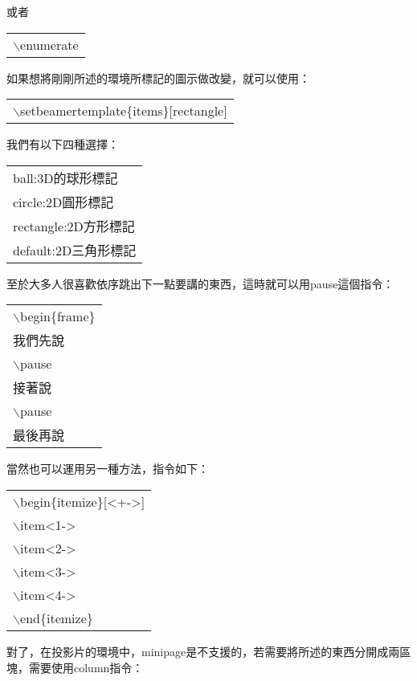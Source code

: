 \documentclass[12pt, a4paper]{article}
\begin{document}
或者
\begin{center}\colorbox{slight}{\begin{tabular}{p{}}
	{$\backslash$enumerate}
\end{tabular}}
\end{center}
如果想將剛剛所述的環境所標記的圖示做改變，就可以使用：
\begin{center}\colorbox{slight}{\begin{tabular}{p{}}
	{$\backslash$setbeamertemplate\{items\}[rectangle]}
\end{tabular}}
\end{center}
我們有以下四種選擇：
\begin{center}\colorbox{slight}{\begin{tabular}{p{}}
	ball:3D的球形標記\\
	circle:2D圓形標記\\
	rectangle:2D方形標記\\
	default:2D三角形標記\\
\end{tabular}}
\end{center}
至於大多人很喜歡依序跳出下一點要講的東西，這時就可以用pause這個指令：
\begin{center}\colorbox{slight}{\begin{tabular}{p{}}
	$\backslash$begin\{frame\}\\
	我們先說\\
	{$\backslash$pause}\\
	接著說\\
	{$\backslash$pause}\\
    最後再說\\
\end{tabular}}
\end{center}
當然也可以運用另一種方法，指令如下：
\begin{center}\colorbox{slight}{\begin{tabular}{p{}}
    $\backslash$begin\{itemize\}[<+->]\\
    $\backslash$item<1->\\
    $\backslash$item<2->\\
    $\backslash$item<3->\\
    $\backslash$item<4->\\
    $\backslash$end\{itemize\}\\
\end{tabular}}
\end{center}
對了，在投影片的環境中，minipage是不支援的，若需要將所述的東西分開成兩區塊，需要使用column指令：
\end{document}
